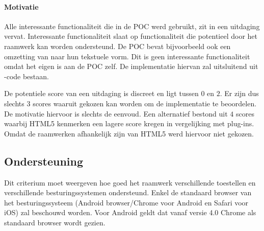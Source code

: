 \paragraph{Motivatie}

Alle interessante functionaliteit die in de POC werd gebruikt, zit in een uitdaging vervat.  
Interessante functionaliteit slaat op functionaliteit die potentieel door het raamwerk kan worden ondersteund.
De POC bevat bijvoorbeeld ook een omzetting van  naar hun tekstuele vorm.
Dit is geen interessante functionaliteit omdat het eigen is aan de POC zelf.
De implementatie hiervan zal uitsluitend uit  \js{}-code bestaan.

De potentiele score van een uitdaging is discreet en ligt tussen $0$ en $2$.
Er zijn dus slechts $3$ scores waaruit gekozen kan worden om de implementatie te beoordelen.
De motivatie hiervoor is slechts de eenvoud.
Een alternatief bestond uit $4$ scores waarbij HTML5 kenmerken een lagere score kregen in vergelijking met plug-ins.
Omdat de raamwerken afhankelijk zijn van HTML5 werd hiervoor niet gekozen.


\subsection{Ondersteuning}
\label{sec:vergelijking-ondersteuning}
Dit criterium moet weergeven hoe goed het raamwerk verschillende toestellen en verschillende besturingssystemen ondersteund.
Enkel de standaard browser van het besturingssysteem (Android browser/Chrome voor Android en Safari voor iOS) zal beschouwd worden.
Voor Android geldt dat vanaf versie 4.0 Chrome als standaard browser wordt gezien. %


